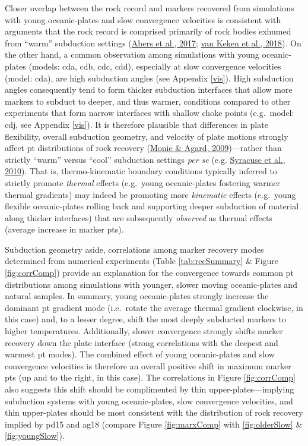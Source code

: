 Closer overlap between the rock record and markers recovered from simulations with young oceanic-plates and slow convergence velocities is consistent with arguments that the rock record is comprised primarily of rock bodies exhumed from ``warm'' subduction settings (\protect\hyperlink{ref-abers2017}{Abers et al., 2017}; \protect\hyperlink{ref-vankeken2018}{van Keken et al., 2018}). On the other hand, a common observation among simulations with young oceanic-plates (models: cda, cdb, cdc, cdd), especially at slow convergence velocities (model: cda), are high subduction angles (see Appendix \ref{vis}). High subduction angles consequently tend to form thicker subduction interfaces that allow more markers to subduct to deeper, and thus warmer, conditions compared to other experiments that form narrow interfaces with shallow choke points (e.g.~model: cdj, see Appendix \ref{vis}). It is therefore plausible that differences in plate flexibility, overall subduction geometry, and velocity of plate motions strongly affect \gls{pt} distributions of rock recovery (\protect\hyperlink{ref-monie2009}{Monie \& Agard, 2009})---rather than strictly ``warm'' versus ``cool'' subduction settings \emph{per se} (e.g. \protect\hyperlink{ref-syracuse2010}{Syracuse et al., 2010}). That is, thermo-kinematic boundary conditions typically inferred to strictly promote \emph{thermal} effects (e.g.~young oceanic-plates fostering warmer thermal gradients) may indeed be promoting more \emph{kinematic} effects (e.g.~young flexible oceanic-plates rolling back and supporting deeper subduction of material along thicker interfaces) that are subsequently \emph{observed} as thermal effects (average increase in marker \glspl{pt}).

Subduction geometry aside, correlations among marker recovery modes determined from numerical experiments (Table \ref{tab:recSummary} \& Figure \ref{fig:corrComp}) provide an explanation for the convergence towards common \gls{pt} distributions among simulations with younger, slower moving oceanic-plates and natural samples. In summary, young oceanic-plates strongly increase the dominant \gls{pt} gradient mode (i.e.~rotate the average thermal gradient clockwise, in this case) and, to a lesser degree, shift the most deeply subducted markers to higher temperatures. Additionally, slower convergence strongly shifts marker recovery down the plate interface (strong correlations with the deepest and warmest \gls{pt} modes). The combined effect of young oceanic-plates and slow convergence velocities is therefore an overall positive shift in maximum marker \glspl{pt} (up and to the right, in this case). The correlations in Figure \ref{fig:corrComp} also suggests this shift should be complimented by thin upper-plates---implying subduction systems with young oceanic-plates, slow convergence velocities, and thin upper-plates should be most consistent with the distribution of rock recovery implied by pd15 and ag18 (compare Figure \ref{fig:marxComp} with \ref{fig:olderSlow} \& \ref{fig:youngSlow}).



